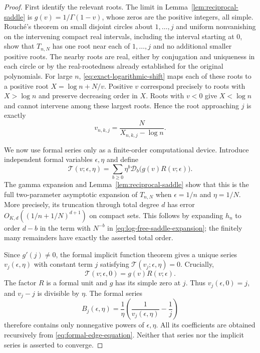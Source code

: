 \documentclass[11pt]{article}
\numberwithin{equation}{section}
\theoremstyle{definition}
\theoremstyle{remark}
\begin{document}
\begin{proof}
First identify the relevant roots.  The limit in
Lemma~\ref{lem:reciprocal-saddle} is
$g(v)=1/\Gamma(1-v)$, whose zeros are the positive integers,
all simple.  Rouch\'e's theorem on small disjoint circles about
$1,\ldots,j$ and uniform nonvanishing on the intervening compact
real intervals, including the interval starting at $0$, show that
$T_{n,N}$ has one root near each of $1,\ldots,j$ and no additional
smaller positive roots.  The nearby roots are real, either by
conjugation and uniqueness in each circle or by the real-rootedness
already established for the original polynomials.  For large $n$,
\eqref{eq:exact-logarithmic-shift} maps each of these roots to a
positive root $X=\log n+N/v$.  Positive $v$ correspond precisely to
roots with $X>\log n$ and preserve decreasing order in $X$.
Roots with $v<0$ give $X<\log n$ and cannot intervene among these
largest roots.  Hence the root approaching $j$ is exactly
\[
 v_{n,k,j}=\frac{N}{X_{n,k,j}-\log n}.
\]

We now use formal series only as a finite-order computational device.
Introduce independent formal variables $\epsilon,\eta$ and define
\begin{equation}\label{eq:formal-edge-equation}
 \mathcal T(v;\epsilon,\eta)
   =\sum_{b\geq0}\eta^b
           \mathcal D_b\bigl(g(v)R(v;\epsilon)\bigr).
\end{equation}
The gamma expansion and Lemma~\ref{lem:reciprocal-saddle} show that
this is the full two-parameter asymptotic expansion of $T_{n,N}$
when $\epsilon=1/n$ and $\eta=1/N$.  More precisely, its truncation
through total degree $d$ has error $O_{K,d}((1/n+1/N)^{d+1})$
on compact sets.  This follows by expanding $h_n$ to order $d-b$
in the term with $N^{-b}$ in
\eqref{eq:log-free-saddle-expansion}; the finitely many remainders
have exactly the asserted total order.

Since $g'(j)\ne0$, the formal implicit function theorem gives a
unique series $v_j(\epsilon,\eta)$ with constant term $j$ satisfying
$\mathcal T(v_j;\epsilon,\eta)=0$.  Crucially,
\[
 \mathcal T(v;\epsilon,0)=g(v)R(v;\epsilon).
\]
The factor $R$ is a formal unit and $g$ has its simple zero at $j$.
Thus $v_j(\epsilon,0)=j$, and $v_j-j$ is divisible by $\eta$.
The formal series
\begin{equation}\label{eq:formal-height-series}
 B_j(\epsilon,\eta)=\frac1\eta
          \left(\frac1{v_j(\epsilon,\eta)}-\frac1j\right)
\end{equation}
therefore contains only nonnegative powers of $\epsilon,\eta$.
All its coefficients are obtained recursively from
\eqref{eq:formal-edge-equation}.  Neither that series nor the
implicit series is asserted to converge.


\end{proof}
\end{document}
